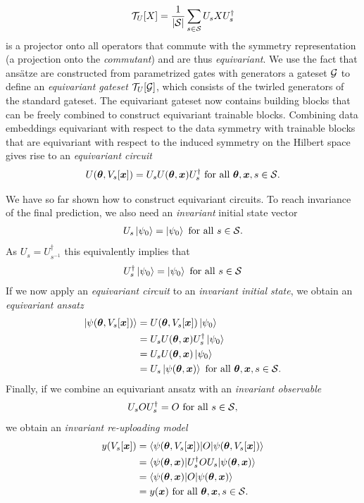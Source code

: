 \documentclass[a4paper,twocolumn,notitlepage,nofootinbib,superscriptaddress,floatfix]{revtex4-2}
\begin{document}
\begin{align}
    \mathcal{T}_U[X] = \frac{1}{|\mathcal{S}|} \sum_{s \in \mathcal{S}} U_s X U_s^{\dagger}
\end{align}
is a projector onto all operators that commute with the symmetry representation (a projection onto the \emph{commutant}) and are thus \emph{equivariant}. We use the fact that ansätze are constructed from parametrized gates with generators a gateset $\mathcal{G}$ to define an \emph{equivariant gateset} $\mathcal{T}_U[\mathcal{G}]$, which consists of the twirled generators of the standard gateset. The equivariant gateset now contains building blocks that can be freely combined to construct equivariant trainable blocks. 
Combining data embeddings equivariant with respect to the data symmetry with trainable blocks that are equivariant with respect to the induced symmetry on the Hilbert space gives rise to an \emph{equivariant circuit}
\begin{align}
    U(\boldsymbol{\theta}, V_s[\boldsymbol{x}]) = U_s U(\boldsymbol{\theta}, \boldsymbol{x}) U_s^{\dagger} \text{ for all } \boldsymbol{\theta}, \boldsymbol{x}, s \in \mathcal{S}.
\end{align}

We have so far shown how to construct equivariant circuits. To reach invariance of the final prediction, we also need an \emph{invariant} initial state vector
\begin{align}
    U_s \ket{\psi_0} = \ket{\psi_0} \text{ for all } s \in \mathcal{S}.
\end{align}
As $U_{s} = U_{s^{-1}}^{\dagger}$ this equivalently implies that 
\begin{align}
    U_s^{\dagger} \ket{\psi_0} = \ket{\psi_0} \text{ for all } s \in \mathcal{S}
\end{align}
If we now apply an \emph{equivariant circuit} to an \emph{invariant initial state}, we obtain an \emph{equivariant ansatz}
\begin{align}
    \ket{\psi(\boldsymbol{\theta}, V_s[\boldsymbol{x}])} &= U(\boldsymbol{\theta}, V_s[\boldsymbol{x}]) \ket{\psi_0} \\
     &= U_s U(\boldsymbol{\theta}, \boldsymbol{x})U_s^{\dagger} \ket{\psi_0} \\
     &= U_s U(\boldsymbol{\theta}, \boldsymbol{x}) \ket{\psi_0} \\
     &= U_s \ket{\psi(\boldsymbol{\theta}, \boldsymbol{x})}\text{ for all } \boldsymbol{\theta}, \boldsymbol{x}, s \in \mathcal{S}.
\end{align}
Finally, if we combine an equivariant ansatz with an \emph{invariant observable}
\begin{align}\label{eqn:invariant_observable}
    U_s O U_s^{\dagger} = O \text{ for all }s \in \mathcal{S},
\end{align}
we obtain an \emph{invariant re-uploading model}
\begin{align}
    y(V_s[\boldsymbol{x}]) &= \langle {\psi(\ensuremath{\boldsymbol{\theta}}, V_s[\ensuremath{\boldsymbol{x}}])} | O | {\psi(\boldsymbol{\theta}, V_s[\boldsymbol{x}])} \rangle\\
    &= \langle {\psi(\ensuremath{\boldsymbol{\theta}}, \ensuremath{\boldsymbol{x}})} | U_s^{\dagger} O U_s | {\psi(\boldsymbol{\theta}, \boldsymbol{x})} \rangle\\
    &= \langle {\psi(\ensuremath{\boldsymbol{\theta}}, \ensuremath{\boldsymbol{x}})} | O | {\psi(\boldsymbol{\theta}, \boldsymbol{x})} \rangle\\
    &= y(\boldsymbol{x})\text{ for all } \boldsymbol{\theta}, \boldsymbol{x}, s \in \mathcal{S}.
\end{align}
\end{document}
